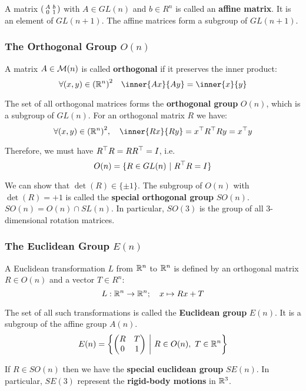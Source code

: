 \noindent
A matrix $\left(\begin{smallmatrix} A & b \\ 0 & 1 \end{smallmatrix} \right)$ with $A \in GL(n)$ and $b \in R^n$
is called an \textbf{affine matrix}. It is an element of $GL(n+1)$.
The affine matrices form a subgroup of $GL(n+1)$.


\subsubsection{The Orthogonal Group $O(n)$}
\label{ssub:the_orthogonal_group_o_n_}

A matrix $A \in \mathcal{M}(n)$ is called \textbf{orthogonal} if it preserves
the inner product:
\[\forall (x,y) \in {(\R^n)}^2 \quad \inner{Ax}{Ay} = \inner{x}{y}\]

\noindent
The set of all orthogonal matrices forms the \textbf{orthogonal group}
$O(n)$, which is a subgroup of $GL(n)$.
For an orthogonal matrix $R$ we have:
\[\forall (x,y) \in {(\R^n)}^2, \quad
\inner{Rx}{Ry} = \tr{x}\tr{R}Ry = \tr{x}y\]

\noindent
Therefore, we must have $R^{\top}R = RR^{\top} = I$, i.e.
\[O(n) = \{ R \in GL(n) \ | \ R^{\top}R = I \}\]

\noindent
We can show that $\det(R) \in \{ \pm 1\}$.
The subgroup of $O(n)$ with $\det(R) = +1$ is called
the \textbf{special orthogonal group} $SO(n)$.
$SO(n) = O(n) \cap SL(n)$.
In particular, $SO(3)$ is the group of all 3-dimensional rotation matrices.


\subsubsection{The Euclidean Group $E(n)$}
\label{ssub:the_euclidean_group_e_n_}

A Euclidean transformation $L$ from $\mathbb{R}^n$ to $\mathbb{R}^n$ is defined by
an orthogonal matrix $R \in O(n)$ and a vector $T \in R^n$:
\[L : \mathbb{R}^n \rightarrow \mathbb{R}^n; \quad x \mapsto Rx + T\]

\noindent
The set of all such transformations is called the
\textbf{Euclidean group} $E(n)$. It is a subgroup of the affine group $A(n)$.
\[E(n) = \left\{
	\begin{pmatrix}
		R & T \\
		0 & 1 \\
	\end{pmatrix}
\ \middle| \ R \in O(n), \ T \in \mathbb{R}^n \right\}\]


\noindent
If $R \in SO(n)$ then we have the \textbf{special euclidean group} $SE(n)$.
In particular, $SE(3)$ represent the \textbf{rigid-body motions} in $\mathbb{R}^3$.\\

